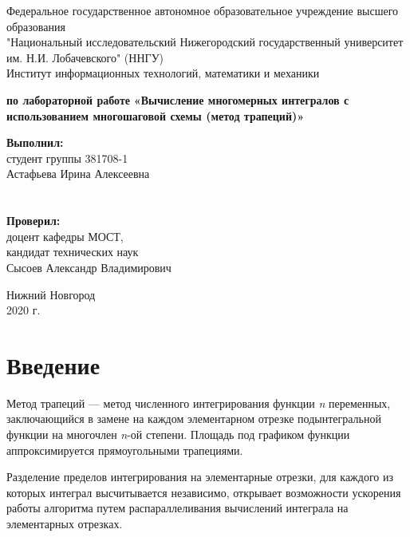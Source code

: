 \documentclass{report}
\begin{document}
    \begin{titlepage}
        \begin{center}
            Федеральное государственное автономное образовательное учреждение высшего образования \\
            "Национальный исследовательский Нижегородский государственный университет им. Н.И. Лобачевского" (ННГУ) \\
            Институт информационных технологий, математики и механики

            \vspace{\fill}

            \textbf{ по лабораторной работе}
            \textbf{\large«Вычисление многомерных интегралов с использованием многошаговой схемы (метод трапеций)»}

            \vspace{\fill}

            \hfill\parbox{8cm}{
                \hspace*{5cm}\hspace*{-5cm}\textbf{Выполнил:} \\ студент группы 381708-1 \\ Астафьева Ирина Алексеевна \\ \\ \\
                \hspace*{5cm}\hspace*{-5cm}\textbf{Проверил:}\\ доцент кафедры МОСТ, \\ кандидат технических наук \\ Сысоев Александр Владимирович
            }

            \vspace{\fill}

            Нижний Новгород \\ 2020 г.
        \end{center}
    \end{titlepage}
    
    \setcounter{page}{2}
    \setlength{\cftsecindent}{0em}
    \setlength{\cftsubsecindent}{1.25em}
    \setlength{\cftsubsubsecindent}{2.5em}
    \setlength{\cftsubsubsecnumwidth}{1.25em}
    \tableofcontents
    
    \newpage
    
    \section*{Введение}
    \par Метод трапеций — метод численного интегрирования функции \textit{n} переменных, заключающийся в замене на каждом элементарном отрезке подынтегральной функции на многочлен \textit{n}-ой степени. Площадь под графиком функции аппроксимируется прямоугольными трапециями.
    \par Разделение пределов интегрирования на элементарные отрезки, для каждого из которых интеграл высчитывается независимо, открывает возможности ускорения работы алгоритма путем распараллеливания вычислений интеграла на элементарных отрезках.
    
\end{document}
